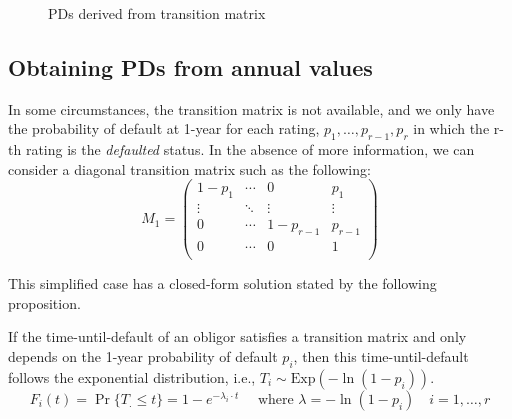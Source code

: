 \documentclass[11pt,fleqn]{book} %
\begin{document}
\begin{figure}[!ht]
	\centering
	\caption{PDs derived from transition matrix}
	\label{fig:pdftm}
\end{figure}

\subsection{Obtaining PDs from annual values}
\label{pdfsv}

In some circumstances, the transition matrix is not available, and we only 
have the probability of default at 1-year for each rating, 
$p_1,\dots,p_{r-1},p_r$ in which the r-th rating is the \emph{defaulted} 
status. In the absence of more information, we can consider a diagonal 
transition matrix such as the following:
\begin{displaymath}
	M_1 = \left(
	\begin{array}{cccc}
		1-p_1  & \cdots & 0         & p_1     \\
		\vdots & \ddots & \vdots    & \vdots  \\
		0      & \cdots & 1-p_{r-1} & p_{r-1} \\
		0      & \cdots & 0         & 1       \\
	\end{array}
	\right)
\end{displaymath}

This simplified case has a closed-form solution stated by the following 
proposition.

\begin{proposition}
	\label{prop:pdfsv}
	If the time-until-default of an obligor satisfies a transition matrix 
	and only depends on the 1-year probability of default $p_i$, then this
	time-until-default follows the exponential distribution, i.e.,
	$T_i \sim \text{Exp}(-\ln(1-p_i))$.
	\begin{displaymath}
		F_i(t) = \Pr\{T_. \le t\} = 1 - e^{-\lambda_i \cdot t} 
		\quad \text{ where } \lambda = -\ln(1-p_i)
		\quad i=1,\dots,r
	\end{displaymath}
\end{proposition}
\end{document}
